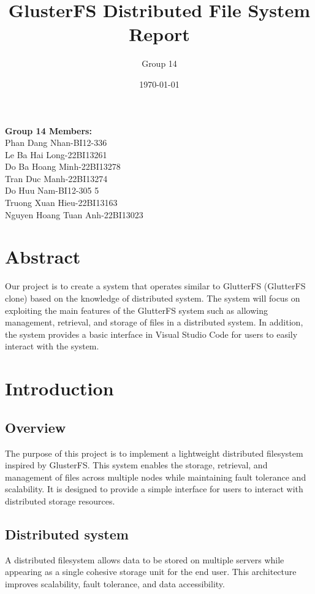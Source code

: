 \documentclass[a4paper,12pt]{article}
\title{GlusterFS Distributed File System Report}
\author{Group 14}
\date{\today}
\begin{document}
\maketitle

\begin{center}
    \Large \textbf{Group 14 Members:}\\[1cm]
    \large Phan Dang Nhan-BI12-336\\[0.5cm]
    \large Le Ba Hai Long-22BI13261\\[0.5cm]
    \large Do Ba Hoang Minh-22BI13278\\[0.5cm]
    \large Tran Duc Manh-22BI13274\\[0.5cm]
    \large Do Huu Nam-BI12-305 5\\[0.5cm]
    \large Truong Xuan Hieu-22BI13163\\[0.5cm]
    \large Nguyen Hoang Tuan Anh-22BI13023\\[1cm]
\end{center}



\tableofcontents

\newpage

\section{Abstract}
Our project is to create a system that operates similar to GlutterFS (GlutterFS clone) based on the knowledge of distributed system. The system will focus on exploiting the main features of the GlutterFS system such as allowing management, retrieval, and storage of files in a distributed system. In addition, the system provides a basic interface in Visual Studio Code for users to easily interact with the system.
\section{Introduction}
\subsection{Overview}
The purpose of this project is to implement a lightweight distributed filesystem inspired by GlusterFS. This system enables the storage, retrieval, and management of files across multiple nodes while maintaining fault tolerance and scalability. It is designed to provide a simple interface for users to interact with distributed storage resources.

\subsection{Distributed system  }
A distributed filesystem allows data to be stored on multiple servers while appearing as a single cohesive storage unit for the end user. This architecture improves scalability, fault tolerance, and data accessibility.
\end{document}

